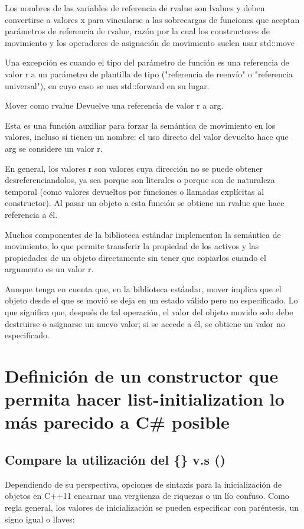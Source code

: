 \documentclass[10pt]{article}
\begin{document}
	Los nombres de las variables de referencia de rvalue son lvalues y deben convertirse a valores x para vincularse a las sobrecargas de funciones que aceptan parámetros de referencia de rvalue, razón por la cual los constructores de movimiento y los operadores de asignación de movimiento suelen usar std::move
	
	Una excepción es cuando el tipo del parámetro de función es una referencia de valor r a un parámetro de plantilla de tipo ("referencia de reenvío" o "referencia universal"), en cuyo caso se usa std::forward en su lugar.
	
	Mover como rvalue
	Devuelve una referencia de valor r a arg.
	
	Esta es una función auxiliar para forzar la semántica de movimiento en los valores, incluso si tienen un nombre: el uso directo del valor devuelto hace que arg se considere un valor r.
	
	En general, los valores r son valores cuya dirección no se puede obtener desreferenciandolos, ya sea porque son literales o porque son de naturaleza temporal (como valores devueltos por funciones o llamadas explícitas al constructor). Al pasar un objeto a esta función se obtiene un rvalue que hace referencia a él.
	
	Muchos componentes de la biblioteca estándar implementan la semántica de movimiento, lo que permite transferir la propiedad de los activos y las propiedades de un objeto directamente sin tener que copiarlos cuando el argumento es un valor r.
	
	Aunque tenga en cuenta que, en la biblioteca estándar, mover implica que el objeto desde el que se movió se deja en un estado válido pero no especificado. Lo que significa que, después de tal operación, el valor del objeto movido solo debe destruirse o asignarse un nuevo valor; si se accede a él, se obtiene un valor no especificado.

\vspace{2em}
\section{Definici\'on de un constructor que permita hacer list-initialization lo más parecido a C\# posible}

\subsection{Compare la utilización del \{\} v.s ()}


Dependiendo de su perspectiva, opciones de sintaxis para la inicialización de objetos en C++11
encarnar una vergüenza de riquezas o un lío confuso. Como regla general,
los valores de inicialización se pueden especificar con paréntesis, un signo igual o llaves:
\end{document}
